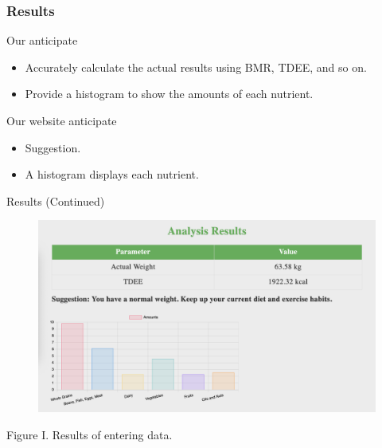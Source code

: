 \documentclass[fleqn]{beamer}
\begin{document}
\begin{frame}
\frametitle{Results}
\begin{minipage}[t]{0.48\textwidth}
\begin{block}{Our anticipate}
\begin{itemize}
\item Accurately calculate the actual results using BMR, TDEE, and so on. \\
\item Provide a histogram to show the amounts of each nutrient. 
\end{itemize}
\end{block}
\end{minipage}
\hfill
\begin{minipage}[t]{0.48\textwidth}
\begin{block}{Our website anticipate}
\begin{itemize}
\item Suggestion.
\item A histogram displays each nutrient.
\end{itemize}
\end{block}
\end{minipage}
\end{frame}
\begin{frame}{Results (Continued)}
\begin{figure}[h]
\centering
\includegraphics[width=\textwidth]{Example.png}
\end{figure}
\centering
Figure I. Results of entering data.
\end{frame}
\end{document}
